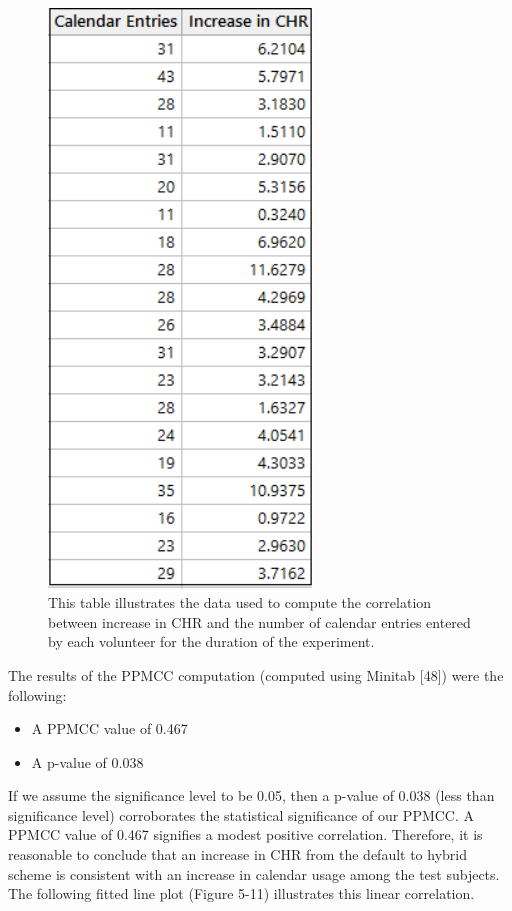 \documentclass[12pt]{uthesis-v12}  %
\begin{document}
				\begin{figure}[h]
					\centering
					\includegraphics[width = 70mm]{images/calendarData.png}
					\caption[Increase in CHR vs Calendar Entries - Table]{This table illustrates the data used to compute the correlation between increase in CHR and the number of calendar entries entered by each volunteer for the duration of the experiment.}
				\end{figure}
				
				The results of the PPMCC computation (computed using Minitab [48]) were the following:
				
				\begin{itemize}
					\item A PPMCC value of 0.467 
					\item A p-value of 0.038
				\end{itemize}
				
				
				 If we assume the significance level to be 0.05, then a p-value of 0.038 (less than significance level) corroborates the statistical significance of our PPMCC. A PPMCC value of 0.467 signifies a modest positive correlation. Therefore, it is reasonable to conclude that an increase in CHR from the default to hybrid scheme is consistent with an increase in calendar usage among the test subjects. The following fitted line plot (Figure 5-11) illustrates this linear correlation.
				
\end{document}
